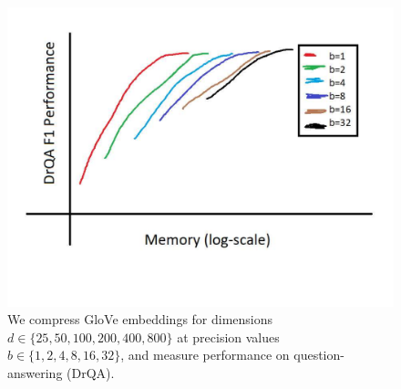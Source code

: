 \begin{figure}
	\begin{center}
		\centerline{\includegraphics[width=\columnwidth]{figures/glove400k_dim_vs_prec.pdf}}
		\caption{We compress GloVe embeddings for dimensions $d\in\{25,50,100,200,400,800\}$ at precision values $b\in\{1,2,4,8,16,32\}$, and measure performance on question-answering (DrQA).  }
		\label{fig:glove400k_dim_vs_prec}
	\end{center}
\end{figure}